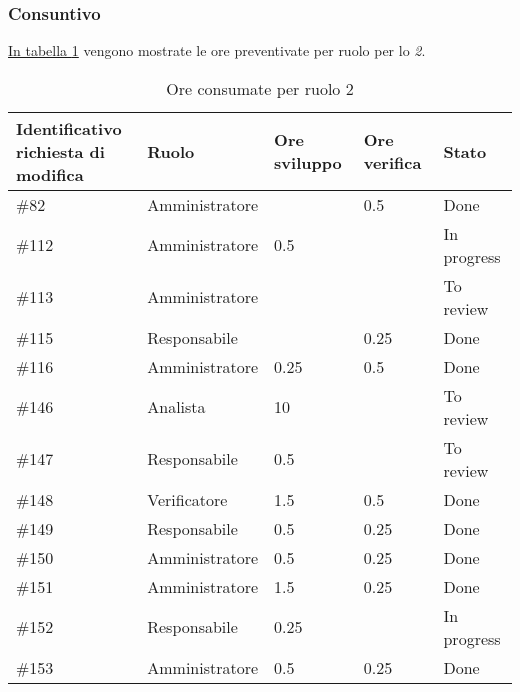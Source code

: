 \subsubsection{Consuntivo}

\hyperref[tab:sprint2_ore_consumate]{In tabella \ref{tab:sprint2_ore_consumate}} vengono mostrate le ore preventivate per ruolo per lo \textit{ 2}.

\begin{table}[H]
    \centering
    \begin{tabular}{| l | l | l | l | l |}
        \hline
                \makecell{\textbf{Identificativo} \\ \textbf{richiesta di modifica}} &
                \textbf{Ruolo} & 
                \textbf{Ore sviluppo} &
                \textbf{Ore verifica} & 
                \textbf{Stato}\\ 
    \hline
        \#82 & Amministratore &  & 0.5 & Done \\
    \hline
        \#112 & Amministratore & 0.5 &  & In progress \\
    \hline
        \#113 & Amministratore &  &  & To review \\
    \hline
        \#115 & Responsabile &  & 0.25 & Done \\
    \hline
        \#116 & Amministratore & 0.25 & 0.5 & Done \\
    \hline
        \#146 & Analista & 10 &  & To review \\
    \hline
        \#147 & Responsabile & 0.5 & & To review \\
    \hline
        \#148 & Verificatore & 1.5 & 0.5 & Done \\
    \hline
        \#149 & Responsabile & 0.5 & 0.25 & Done \\
    \hline
        \#150 & Amministratore & 0.5 & 0.25 & Done \\
     \hline
        \#151 & Amministratore & 1.5 & 0.25 & Done \\
    \hline
        \#152 & Responsabile & 0.25 &  & In progress \\
    \hline
        \#153 & Amministratore& 0.5 & 0.25 & Done \\
    \hline
    \end{tabular}
    \caption{Ore consumate per ruolo  2}
    \label{tab:sprint2_ore_consumate} 
\end{table}